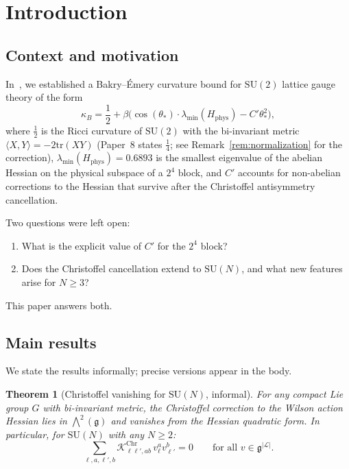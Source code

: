 \documentclass[11pt,a4paper]{article}
\theoremstyle{plain}
\newtheorem{theorem}{Theorem}[section]
\theoremstyle{definition}
\theoremstyle{remark}
\newcommand{\SU}{\mathrm{SU}}
\newcommand{\tr}{\mathrm{tr}}
\newcommand{\ip}[2]{\langle #1, #2 \rangle}
\newcommand{\cK}{\mathcal{K}}
\newcommand{\cL}{\mathcal{L}}
\begin{document}
\section{Introduction}\label{sec:intro}

\subsection{Context and motivation}

In~\cite{Fontes2026Paper8}, we established a Bakry--\'Emery
curvature bound for $\SU(2)$ lattice gauge theory of the form
\begin{equation}\label{eq:paper8-bound}
\kappa_B = \frac{1}{2}
+ \beta\bigl(\cos(\theta_*)\cdot\lambda_{\min}(H_{\mathrm{phys}})
- C'\theta_*^2\bigr),
\end{equation}
where $\frac{1}{2}$ is the Ricci curvature of $\SU(2)$ with the
bi-invariant metric $\ip{X}{Y} = -2\tr(XY)$
(Paper~8 states $\frac{1}{4}$; see Remark~\ref{rem:normalization}
for the correction),
$\lambda_{\min}(H_{\mathrm{phys}}) = 0.6893$ is the smallest
eigenvalue of the abelian Hessian on the physical subspace of a
$2^4$ block, and $C'$ accounts for non-abelian corrections to the
Hessian that survive after the Christoffel antisymmetry
cancellation.

Two questions were left open:
\begin{enumerate}[label=(\alph*)]
\item What is the explicit value of $C'$ for the $2^4$ block?
\item Does the Christoffel cancellation extend to $\SU(N)$, and
  what new features arise for $N \geq 3$?
\end{enumerate}
This paper answers both.


\subsection{Main results}

We state the results informally; precise versions appear in the
body.

\begin{theorem}[Christoffel vanishing for $\SU(N)$, informal]\label{thm:A-informal}
For any compact Lie group $G$ with bi-invariant metric, the
Christoffel correction to the Wilson action Hessian lies in
$\bigwedge^2(\mathfrak{g})$ and vanishes from the Hessian
quadratic form. In particular, for $\SU(N)$ with any $N \geq 2$:
\begin{equation}
\sum_{\ell,a,\ell',b}
\cK^{\mathrm{Chr}}_{\ell\ell',ab}\,v_\ell^a v_{\ell'}^b = 0
\qquad \text{for all } v \in \mathfrak{g}^{|\cL|}.
\end{equation}
\end{theorem}
\end{document}

